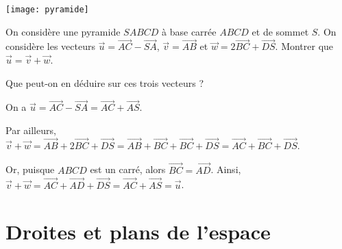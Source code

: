 \documentclass[11pt,fleqn, openany]{book} %
\begin{document}
\begin{exercise}[topic=geo01]
\hspace{0pt}
\begin{minipage}{0.3\linewidth}
 \begin{center}
\texttt{[image: pyramide]}
\end{center}
\end{minipage}\hfill\begin{minipage}{0.6\linewidth}

On considère une pyramide $SABCD$ à base carrée $ABCD$ et de sommet $S$. 
\vskip5pt
On considère les vecteurs $\vec u = \overrightarrow{AC}-\overrightarrow{SA}$, $\vec v = \overrightarrow{AB}$ et $\vec w = 2\overrightarrow{BC} + \overrightarrow{DS}$. Montrer que $\vec u = \vec v + \vec w$.

Que peut-on en déduire sur ces trois vecteurs ?\end{minipage}\end{exercise}

\begin{solution}
On a $\vec u = \overrightarrow{AC}-\overrightarrow{SA}=\overrightarrow{AC}+\overrightarrow{AS}$.

Par ailleurs, $\vec v + \vec w=\overrightarrow{AB} + 2\overrightarrow{BC} + \overrightarrow{DS}=\overrightarrow{AB} + \overrightarrow{BC} + \overrightarrow{BC}+\overrightarrow{DS}=\overrightarrow{AC}+\overrightarrow{BC}+\overrightarrow{DS}$.

Or, puisque $ABCD$ est un carré, alors $\overrightarrow{BC}=\overrightarrow{AD}$. Ainsi, $\vec v + \vec w = \overrightarrow{AC}+\overrightarrow{AD}+\overrightarrow{DS}=\overrightarrow{AC}
+\overrightarrow{AS}=\vec u$.\end{solution}



\section*{Droites et plans de l'espace}
\end{document}
